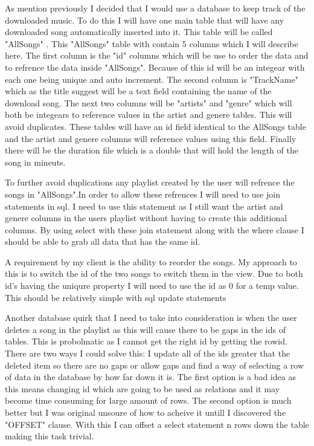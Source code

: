 \documentclass{article}
\begin{document}
As mention previously I decided that I would use a database to keep track of the
downloaded music. To do this I will have one main table that will have any
downloaded song automatically inserted into it. This table will be called "AllSongs"
. This "AllSongs" table with contain 5 columns which I will describe here.
The first column is the "id" columns which will be use to order the data
and to refrence the data inside "AllSongs". Because of this id will be an
integear with each one being unique and auto increment. The second column
is "TrackName" which as the title suggest will be a text field containing
the name of the download song. The next two columns will be "artists" and
"genre" which will both be integears to reference values in the artist and
genere tables. This will avoid duplicates. These tables will have an id field
identical to the AllSongs table and the artist and genere columns will
reference values using this field. Finally there will be the duration
file which is a double that will hold the length of the song in mineuts.

To further avoid duplications any playlist created by the user will refrence
the songs in "AllSongs".In order to allow these refrences I will need to use join
statements in sql. I need to use this statement as I still want the artist and 
genere columns in the users playlist without having to create this additional columns.
By using select with these join statement along with the where clause I should
be able to grab all data that has the same id.

A requirement by my client is the ability to reorder the songs. My approach
to this is to switch the id of the two songs to switch them in the view.
Due to both id's having the uniqure property I will need to use the id as
0 for a temp value. This should be relatively simple with sql update statements

Another database quirk that I need to take into consideration is when the user
deletes a song in the playlist as this will cause there to be gaps in the
ids of tables. This is probolmatic as I cannot get the right id by getting 
the rowid. There are two ways I could solve this: I update all of the ids
greater that the deleted item so there are no gaps or allow gaps and find
a way of selecting a row of data in the database by how far down it is.
The first option is a bad idea as this means changing id which are going
to be used as relations and it may become time consuming for large
amount of rows. The second option is much better but I was original unsoure
of how to acheive it untill I discovered the "OFFSET" clause. With this
I can offset a select statement n rows down the table making this task
trivial.
\end{document}
